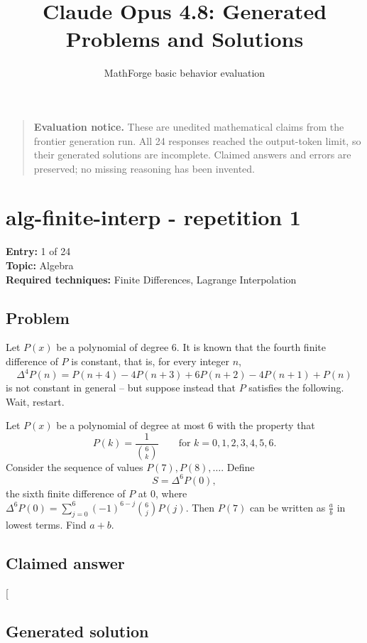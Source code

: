\documentclass[
  11pt,
  letterpaper,
]{article}
\title{Claude Opus 4.8: Generated Problems and Solutions}
\author{MathForge basic behavior evaluation}
\date{}
\begin{document}
\maketitle

{
\setcounter{tocdepth}{1}
\tableofcontents
}
\begin{quote}
\textbf{Evaluation notice.} These are unedited mathematical claims from
the frontier generation run. All 24 responses reached the output-token
limit, so their generated solutions are incomplete. Claimed answers and
errors are preserved; no missing reasoning has been invented.
\end{quote}

\section{alg-finite-interp - repetition
1}\label{alg-finite-interp---repetition-1}

\textbf{Entry:} 1 of 24\\
\textbf{Topic:} Algebra\\
\textbf{Required techniques:} Finite Differences, Lagrange Interpolation

\subsection{Problem}\label{problem}

Let \(P(x)\) be a polynomial of degree \(6\). It is known that the
fourth finite difference of \(P\) is constant, that is, for every
integer \(n\),
\[\Delta^4 P(n) = P(n+4) - 4P(n+3) + 6P(n+2) - 4P(n+1) + P(n)\] is not
constant in general -- but suppose instead that \(P\) satisfies the
following. Wait, restart.

Let \(P(x)\) be a polynomial of degree at most \(6\) with the property
that
\[P(k) = \frac{1}{\binom{6}{k}} \qquad \text{for } k = 0, 1, 2, 3, 4, 5, 6.\]
Consider the sequence of values \(P(7), P(8), \dots\). Define
\[S = \Delta^6 P(0),\] the sixth finite difference of \(P\) at \(0\),
where \(\Delta^6 P(0) = \sum_{j=0}^{6} (-1)^{6-j}\binom{6}{j} P(j).\)
Then \(P(7)\) can be written as \(\tfrac{a}{b}\) in lowest terms. Find
\(a+b\).

\subsection{Claimed answer}\label{claimed-answer}

{[}\boxed{65}{]}

\subsection{Generated solution}\label{generated-solution}
\end{document}

